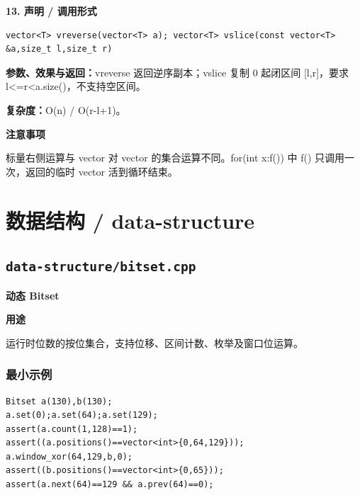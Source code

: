 \documentclass[UTF8,a4paper,10pt]{ctexart}
\newcommand{\TemplUsage}[1]{\textbf{用途}\par #1\par}
\newcommand{\TemplNote}[1]{\textbf{注意事项}\par #1\par}
\begin{document}
\noindent\begin{minipage}{\textwidth}
\textbf{13. 声明 / 调用形式}
\begin{lstlisting}
vector<T> vreverse(vector<T> a); vector<T> vslice(const vector<T> &a,size_t l,size_t r)
\end{lstlisting}
\textbf{参数、效果与返回：}vreverse 返回逆序副本；vslice 复制 0 起闭区间 [l,r]，要求 l<=r<a.size()，不支持空区间。

\textbf{复杂度：}O(n) / O(r-l+1)。

\TemplNote{标量右侧运算与 vector 对 vector 的集合运算不同。for(int x:f()) 中 f() 只调用一次，返回的临时 vector 活到循环结束。}
\end{minipage}\par\vspace{0.4em}
\clearpage
\section{数据结构 / data-structure}
\subsection{\texttt{data-structure/bitset.cpp}}
\textbf{动态 Bitset}\par
\TemplUsage{运行时位数的按位集合，支持位移、区间计数、枚举及窗口位运算。}
\subsubsection*{最小示例}
\begin{lstlisting}
Bitset a(130),b(130);
a.set(0);a.set(64);a.set(129);
assert(a.count(1,128)==1);
assert((a.positions()==vector<int>{0,64,129}));
a.window_xor(64,129,b,0);
assert((b.positions()==vector<int>{0,65}));
assert(a.next(64)==129 && a.prev(64)==0);
\end{lstlisting}
\end{document}
